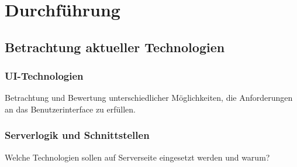 \section{Durchführung}
\subsection{Betrachtung aktueller Technologien}

\subsubsection{UI-Technologien}

Betrachtung und Bewertung unterschiedlicher Möglichkeiten, die Anforderungen an das Benutzerinterface zu erfüllen.

\subsubsection{Serverlogik und Schnittstellen}

Welche Technologien sollen auf Serverseite eingesetzt werden und warum?